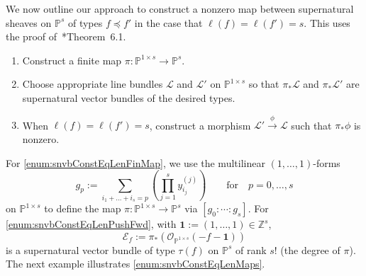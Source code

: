 \documentclass[12pt]{amsart}
\theoremstyle{definition}
\newcommand{\EE}{\mathcal{E}}
\newcommand{\cO}{{\mathcal O}}
\newcommand{\PP}{\mathbb{P}}
\newcommand{\ZZ}{\mathbb{Z}}
\begin{document}
We now outline our approach to construct a nonzero map between supernatural sheaves on $\PP^s$ of types $f\preceq f'$ in the case that $\ell(f) = \ell(f') = s$. 
This uses the proof of~\cite{EiScConjOfBS07}*{Theorem~6.1}. 
\begin{enumerate}
\item\label{enum:snvbConstEqLenFinMap} 
	Construct a finite map $\pi\colon  \PP^{1\times s}\to \PP^{s}$.
\item\label{enum:snvbConstEqLenPushFwd} 
	Choose appropriate line bundles $\mathcal L$ and $\mathcal L'$ on $\PP^{1\times s}$ 
	so that $\pi_* \mathcal L$ and $\pi_*\mathcal L'$ are supernatural vector bundles
	of the desired types.
\item\label{enum:snvbConstEqLenMaps} 
	When $\ell(f) = \ell(f') = s$, construct a morphism $\mathcal L' \stackrel{\phi}{\longrightarrow}
    \mathcal L$ such that $\pi_* \phi$ is nonzero.
\end{enumerate}
For \eqref{enum:snvbConstEqLenFinMap}, 
we use the multilinear $(1,\dots,1)$-forms 
\begin{equation}\label{eqn:fp}
g_p:= \sum_{i_1+\dots+i_{s}=p} \left( \prod_{j=1}^{s} y_{i_j}^{(j)}
\right) \qquad \text{for}\quad p=0, \dots, s
\end{equation}
on $\PP^{1\times s}$ to define the map 
$\pi\colon \PP^{1\times s}\to \PP^s$ via $[g_0:\cdots:g_s]$.
For \eqref{enum:snvbConstEqLenPushFwd}, 
with $\mathbf 1 :=(1,\dots, 1)\in\ZZ^s$,
\[
\EE_f:=\pi_*\left(\cO_{\PP^{1\times s}}(-f-\mathbf 1)\right) 
\]
is a supernatural vector bundle of type $\tau(f)$ on $\PP^s$ of rank
$s!$ (the degree of $\pi$). The next example illustrates
\eqref{enum:snvbConstEqLenMaps}.
\end{document}
